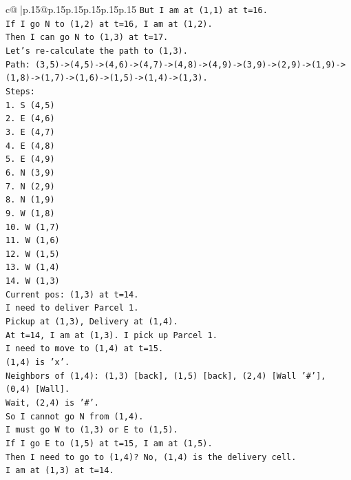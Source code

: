 \documentclass{article}
\begin{document}
{\begin{supertabular}{c@{$\;$}|p{.15\linewidth}@{}p{.15\linewidth}p{.15\linewidth}p{.15\linewidth}p{.15\linewidth}p{.15\linewidth}}
{{{\texttt{But I am at (1,1) at t=16.} \\
\texttt{If I go N to (1,2) at t=16, I am at (1,2).} \\
\texttt{Then I can go N to (1,3) at t=17.} \\
\texttt{Let's re{-}calculate the path to (1,3).} \\
\texttt{Path: (3,5){-}>(4,5){-}>(4,6){-}>(4,7){-}>(4,8){-}>(4,9){-}>(3,9){-}>(2,9){-}>(1,9){-}>(1,8){-}>(1,7){-}>(1,6){-}>(1,5){-}>(1,4){-}>(1,3).} \\
\texttt{Steps:} \\
\texttt{1. S (4,5)} \\
\texttt{2. E (4,6)} \\
\texttt{3. E (4,7)} \\
\texttt{4. E (4,8)} \\
\texttt{5. E (4,9)} \\
\texttt{6. N (3,9)} \\
\texttt{7. N (2,9)} \\
\texttt{8. N (1,9)} \\
\texttt{9. W (1,8)} \\
\texttt{10. W (1,7)} \\
\texttt{11. W (1,6)} \\
\texttt{12. W (1,5)} \\
\texttt{13. W (1,4)} \\
\texttt{14. W (1,3)} \\
\texttt{Current pos: (1,3) at t=14.} \\
\texttt{I need to deliver Parcel 1.} \\
\texttt{Pickup at (1,3), Delivery at (1,4).} \\
\texttt{At t=14, I am at (1,3). I pick up Parcel 1.} \\
\texttt{I need to move to (1,4) at t=15.} \\
\texttt{(1,4) is 'x'.} \\
\texttt{Neighbors of (1,4): (1,3) {[}back{]}, (1,5) {[}back{]}, (2,4) {[}Wall '\#'{]}, (0,4) {[}Wall{]}.} \\
\texttt{Wait, (2,4) is '\#'.} \\
\texttt{So I cannot go N from (1,4).} \\
\texttt{I must go W to (1,3) or E to (1,5).} \\
\texttt{If I go E to (1,5) at t=15, I am at (1,5).} \\
\texttt{Then I need to go to (1,4)? No, (1,4) is the delivery cell.} \\
\texttt{I am at (1,3) at t=14.} \\
}}}
\end{supertabular}}
\end{document}
